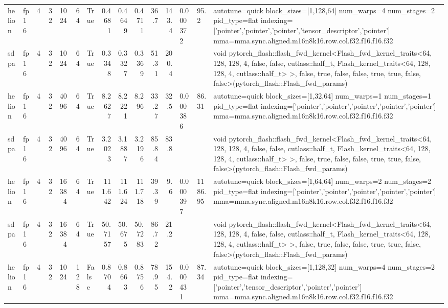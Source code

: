 \begin{table}[htbp]
\begin{tabular}{llrrrrlrrrrrlll}
    helion & fp16 & 4 & 32 & 1024 & 64 & True & 0.4681 & 0.4649 & 0.4711 & 36.7 & 143.4 & 0.000372 & 95.2 & autotune=quick block\_sizes=[1,128,64] num\_warps=4 num\_stages=2 pid\_type=flat indexing=['pointer','pointer','pointer','tensor\_descriptor','pointer'] mma=mma.sync.aligned.m16n8k16.row.col.f32.f16.f16.f32 \\
    sdpa & fp16 & 4 & 32 & 1024 & 64 & True & 0.3348 & 0.3327 & 0.3369 & 51.31 & 200.4 &  &  & void pytorch\_flash::flash\_fwd\_kernel<Flash\_fwd\_kernel\_traits<64, 128, 128, 4, false, false, cutlass::half\_t, Flash\_kernel\_traits<64, 128, 128, 4, cutlass::half\_t> >, false, true, false, false, true, true, false, false>(pytorch\_flash::Flash\_fwd\_params) \\
    helion & fp16 & 4 & 32 & 4096 & 64 & True & 8.2627 & 8.2221 & 8.296 & 33.27 & 32.5 & 0.000386 & 86.31 & autotune=quick block\_sizes=[1,32,64] num\_warps=1 num\_stages=1 pid\_type=flat indexing=['pointer','pointer','pointer','pointer','pointer'] mma=mma.sync.aligned.m16n8k16.row.col.f32.f16.f16.f32 \\
    sdpa & fp16 & 4 & 32 & 4096 & 64 & True & 3.2023 & 3.1887 & 3.2196 & 85.84 & 83.8 &  &  & void pytorch\_flash::flash\_fwd\_kernel<Flash\_fwd\_kernel\_traits<64, 128, 128, 4, false, false, cutlass::half\_t, Flash\_kernel\_traits<64, 128, 128, 4, cutlass::half\_t> >, false, true, false, false, true, true, false, false>(pytorch\_flash::Flash\_fwd\_params) \\
    helion & fp16 & 4 & 32 & 16384 & 64 & True & 111.642 & 111.624 & 111.718 & 39.39 & 9.6 & 0.000397 & 1186.95 & autotune=quick block\_sizes=[1,64,64] num\_warps=2 num\_stages=2 pid\_type=flat indexing=['pointer','pointer','pointer','pointer','pointer'] mma=mma.sync.aligned.m16n8k16.row.col.f32.f16.f16.f32 \\
    sdpa & fp16 & 4 & 32 & 16384 & 64 & True & 50.7157 & 50.675 & 50.7283 & 86.72 & 21.2 &  &  & void pytorch\_flash::flash\_fwd\_kernel<Flash\_fwd\_kernel\_traits<64, 128, 128, 4, false, false, cutlass::half\_t, Flash\_kernel\_traits<64, 128, 128, 4, cutlass::half\_t> >, false, true, false, false, true, true, false, false>(pytorch\_flash::Flash\_fwd\_params) \\
    helion & fp16 & 4 & 32 & 1024 & 128 & False & 0.8704 & 0.8663 & 0.8756 & 78.95 & 154.2 & 0.000431 & 87.34 & autotune=quick block\_sizes=[1,128,32] num\_warps=4 num\_stages=2 pid\_type=flat indexing=['pointer','tensor\_descriptor','pointer','pointer'] mma=mma.sync.aligned.m16n8k16.row.col.f32.f16.f16.f32 \\

\end{tabular}
\end{table}
